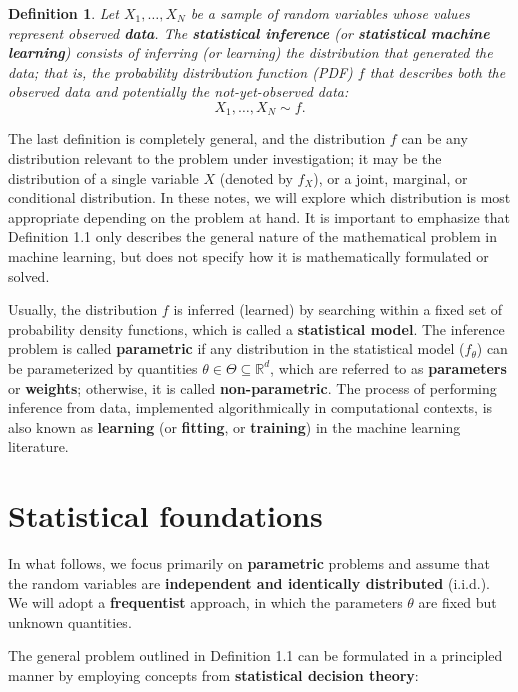 \documentclass{report}
\newtheorem{definition}{Definition}[chapter]
\begin{document}
\begin{definition}
Let $X_1,\dots,X_N$ be a sample of random variables whose values represent observed \textbf{data}. The \textbf{statistical inference} (or \textbf{statistical machine learning}) consists of inferring (or learning) the distribution that generated the data; that is, the probability distribution function (PDF) $f$ that describes both the observed data and potentially the not-yet-observed data:
\begin{equation}
X_1,\dots,X_N \sim f.
\end{equation}
\end{definition}

The last definition is completely general, and the distribution $f$ can be any distribution relevant to the problem under investigation; it may be the distribution of a single variable $X$ (denoted by $f_X$), or a joint, marginal, or conditional distribution. In these notes, we will explore which distribution is most appropriate depending on the problem at hand. It is important to emphasize that Definition 1.1 only describes the general nature of the mathematical problem in machine learning, but does not specify how it is mathematically formulated or solved.

Usually, the distribution $f$ is inferred (learned) by searching within a fixed set of probability density functions, which is called a \textbf{statistical model}. The inference problem is called \textbf{parametric} if any distribution in the statistical model ($f_\theta$) can be parameterized by quantities $\theta \in \Theta \subseteq \mathbb{R}^d$, which are referred to as \textbf{parameters} or \textbf{weights}; otherwise, it is called \textbf{non-parametric}. The process of performing inference from data, implemented algorithmically in computational contexts, is also known as \textbf{learning} (or \textbf{fitting}, or \textbf{training}) in the machine learning literature.

\section{Statistical foundations}
In what follows, we focus primarily on \textbf{parametric} problems and assume that the random variables are \textbf{independent and identically distributed} (i.i.d.). We will adopt a \textbf{frequentist} approach, in which the parameters $\theta$ are fixed but unknown quantities.

The general problem outlined in Definition 1.1 can be formulated in a principled manner by employing concepts from \textbf{statistical decision theory}:
\end{document}
